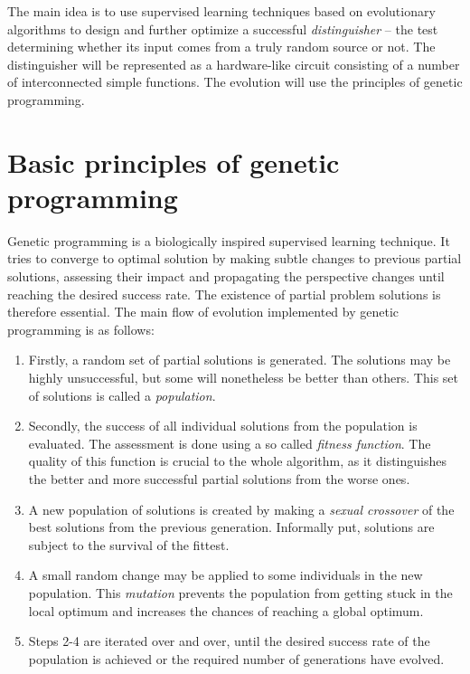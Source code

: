 \documentclass[12pt,oneside]{fithesis2}
\begin{document}
\noindent
The main idea is to use supervised learning techniques based on evolutionary algorithms to design and further 
optimize a successful \textit{distinguisher} -- the test determining whether its input comes from a truly random source or not. 
The distinguisher will be represented as a hardware-like circuit consisting of a number of interconnected simple functions.
The evolution will use the principles of genetic programming.

\section{Basic principles of genetic programming}
\label{sec:basic-ga}

Genetic programming is a biologically inspired supervised learning technique. It tries to converge to optimal 
solution by making subtle changes to previous partial solutions, assessing their impact and propagating the perspective changes
until reaching the desired success rate. The existence of partial problem solutions is therefore essential.
The main flow of evolution implemented by genetic programming is as follows:
\begin{enumerate} \rightskip=2em
\item Firstly, a random set of partial solutions is generated. The solutions may be highly unsuccessful,
but some will nonetheless be better than others. This set of solutions is called a \textit{population}.
\item Secondly, the success of all individual solutions from the population is evaluated. The assessment is done using
a so called \textit{fitness function}. The quality of this function is crucial to the whole algorithm, as it
distinguishes the better and more successful partial solutions from the worse ones.
\item A new population of solutions is created by making a \textit{sexual crossover} of the best solutions from the 
previous generation. Informally put, solutions are subject to the survival of the fittest.
\item A small random change may be applied to some individuals in the new population. This \textit{mutation} prevents
the population from getting stuck in the local optimum and increases the chances of reaching a global optimum.
\item Steps 2-4 are iterated over and over, until the desired success rate of the population is achieved or the
required number of generations have evolved.
\end{enumerate}
\end{document}
